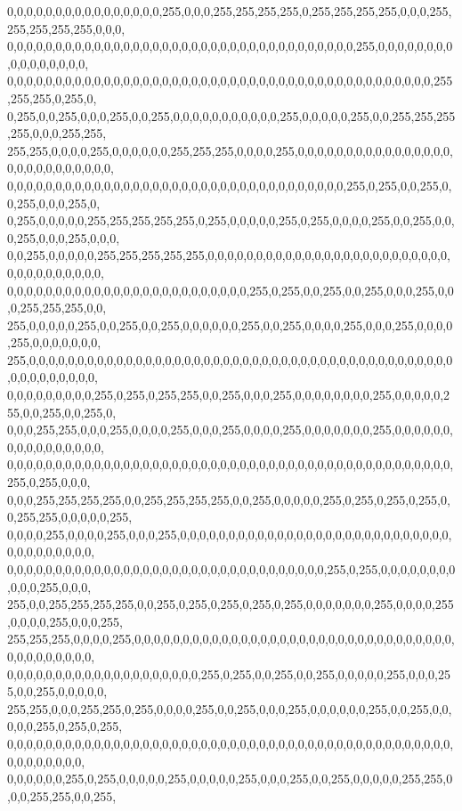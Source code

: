 \begin{DoxyCode}
      0,0,0,0,0,0,0,0,0,0,0,0,0,0,0,0,255,0,0,0,255,255,255,255,0,255,255,255,255,0,0,0,255,255,255,255,255,0,0,0,
      0,0,0,0,0,0,0,0,0,0,0,0,0,0,0,0,0,0,0,0,0,0,0,0,0,0,0,0,0,0,0,0,0,0,0,0,255,0,0,0,0,0,0,0,0,0,0,0,0,0,0,0,0,
      0,0,0,0,0,0,0,0,0,0,0,0,0,0,0,0,0,0,0,0,0,0,0,0,0,0,0,0,0,0,0,0,0,0,0,0,0,0,0,0,0,0,0,0,255,255,255,0,255,0,
      0,255,0,0,255,0,0,0,255,0,0,255,0,0,0,0,0,0,0,0,0,0,0,255,0,0,0,0,0,255,0,0,255,255,255,255,0,0,0,255,255,
      255,255,0,0,0,0,255,0,0,0,0,0,0,255,255,255,0,0,0,0,255,0,0,0,0,0,0,0,0,0,0,0,0,0,0,0,0,0,0,0,0,0,0,0,0,0,0,0,
      0,0,0,0,0,0,0,0,0,0,0,0,0,0,0,0,0,0,0,0,0,0,0,0,0,0,0,0,0,0,0,0,0,0,0,255,0,255,0,0,255,0,0,255,0,0,0,255,0,
      0,255,0,0,0,0,0,255,255,255,255,255,0,255,0,0,0,0,0,255,0,255,0,0,0,0,255,0,0,255,0,0,0,255,0,0,0,255,0,0,0,
      0,0,255,0,0,0,0,0,255,255,255,255,255,0,0,0,0,0,0,0,0,0,0,0,0,0,0,0,0,0,0,0,0,0,0,0,0,0,0,0,0,0,0,0,0,0,0,0,
      0,0,0,0,0,0,0,0,0,0,0,0,0,0,0,0,0,0,0,0,0,0,0,0,0,255,0,255,0,0,255,0,0,255,0,0,0,255,0,0,0,255,255,255,0,0,
      255,0,0,0,0,0,255,0,0,255,0,0,255,0,0,0,0,0,0,255,0,0,255,0,0,0,0,255,0,0,0,255,0,0,0,0,255,0,0,0,0,0,0,0,
      255,0,0,0,0,0,0,0,0,0,0,0,0,0,0,0,0,0,0,0,0,0,0,0,0,0,0,0,0,0,0,0,0,0,0,0,0,0,0,0,0,0,0,0,0,0,0,0,0,0,0,0,0,0,
      0,0,0,0,0,0,0,0,0,255,0,255,0,255,255,0,0,255,0,0,0,255,0,0,0,0,0,0,0,0,255,0,0,0,0,0,255,0,0,255,0,0,255,0,
      0,0,0,255,255,0,0,0,255,0,0,0,0,255,0,0,0,255,0,0,0,0,255,0,0,0,0,0,0,0,255,0,0,0,0,0,0,0,0,0,0,0,0,0,0,0,0,
      0,0,0,0,0,0,0,0,0,0,0,0,0,0,0,0,0,0,0,0,0,0,0,0,0,0,0,0,0,0,0,0,0,0,0,0,0,0,0,0,0,0,0,0,0,0,255,0,255,0,0,0,
      0,0,0,255,255,255,255,0,0,255,255,255,255,0,0,255,0,0,0,0,0,255,0,255,0,255,0,255,0,0,255,255,0,0,0,0,0,255,
      0,0,0,0,255,0,0,0,0,255,0,0,0,255,0,0,0,0,0,0,0,0,0,0,0,0,0,0,0,0,0,0,0,0,0,0,0,0,0,0,0,0,0,0,0,0,0,0,0,0,0,
      0,0,0,0,0,0,0,0,0,0,0,0,0,0,0,0,0,0,0,0,0,0,0,0,0,0,0,0,0,0,0,0,0,255,0,255,0,0,0,0,0,0,0,0,0,0,0,255,0,0,0,
      255,0,0,255,255,255,255,0,0,255,0,255,0,255,0,255,0,255,0,0,0,0,0,0,0,255,0,0,0,0,255,0,0,0,0,255,0,0,0,255,
      255,255,255,0,0,0,0,255,0,0,0,0,0,0,0,0,0,0,0,0,0,0,0,0,0,0,0,0,0,0,0,0,0,0,0,0,0,0,0,0,0,0,0,0,0,0,0,0,0,0,
      0,0,0,0,0,0,0,0,0,0,0,0,0,0,0,0,0,0,0,0,255,0,255,0,0,255,0,0,255,0,0,0,0,0,255,0,0,0,255,0,0,255,0,0,0,0,0,
      255,255,0,0,0,255,255,0,255,0,0,0,0,255,0,0,255,0,0,0,255,0,0,0,0,0,0,255,0,0,255,0,0,0,0,0,255,0,255,0,255,
      0,0,0,0,0,0,0,0,0,0,0,0,0,0,0,0,0,0,0,0,0,0,0,0,0,0,0,0,0,0,0,0,0,0,0,0,0,0,0,0,0,0,0,0,0,0,0,0,0,0,0,0,0,0,
      0,0,0,0,0,0,255,0,255,0,0,0,0,0,255,0,0,0,0,0,255,0,0,0,255,0,0,255,0,0,0,0,0,255,255,0,0,0,255,255,0,0,255,

\end{DoxyCode}
